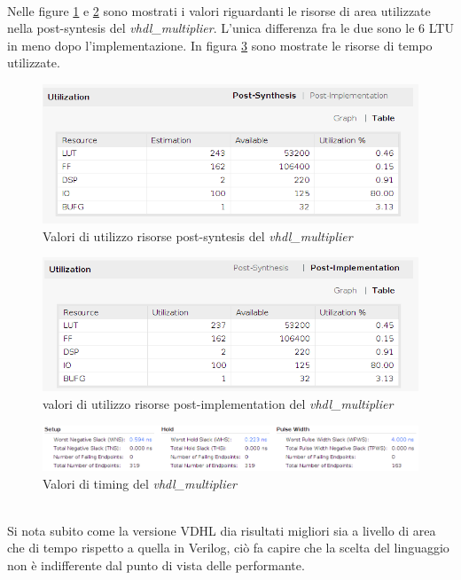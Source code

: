 \documentclass[]{IEEEtran}
\begin{document}
\\Nelle figure \ref{fig:UTIL_SYNT_VHDL} e \ref{fig:UTIL_IMPL_VHDL} sono mostrati i valori riguardanti le risorse di area utilizzate nella post-syntesis del \textit{vhdl\_multiplier}. L'unica differenza fra le due sono le 6 LTU in meno dopo l'implementazione. In figura \ref{fig:TIMING_VHDL} sono mostrate le risorse di tempo utilizzate.
\begin{figure}[!htb]
    \centering
    \includegraphics[width=0.9\linewidth]{figures/util_synt_vhdl}
    \caption{Valori di utilizzo risorse post-syntesis del \textit{vhdl\_multiplier}}
    \label{fig:UTIL_SYNT_VHDL}
\end{figure}
\begin{figure}[!htb]
    \centering
    \includegraphics[width=0.9\linewidth]{figures/util_impl_vhdl}
    \caption{valori di utilizzo risorse post-implementation del \textit{vhdl\_multiplier}}
    \label{fig:UTIL_IMPL_VHDL}
\end{figure}
\begin{figure}[!htb]
    \centering
    \includegraphics[width=1.0\linewidth]{figures/timing_vhdl}
    \caption{Valori di timing del \textit{vhdl\_multiplier}}
    \label{fig:TIMING_VHDL}
\end{figure}
\\Si nota subito come la versione VDHL dia risultati migliori sia a livello di area che di tempo rispetto a quella in Verilog, ciò fa capire che la scelta del linguaggio non è indifferente dal punto di vista delle performante.
\end{document}
